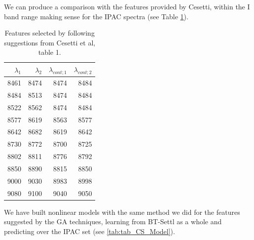 
We can produce a comparison with the features provided by Cesetti, within the I band range
making sense for the IPAC spectra (see Table \ref{tab:tab_CS_T}).
\begin{table}
\begin{center}
\begin{tabular}{rrrr}
  \hline
  $\lambda_1$ & $\lambda_2$ & $\lambda_{cont;1}$ & $\lambda_{cont;2} $ \\ 
  \hline
8461 & 8474 & 8474 & 8484 \\
8484 & 8513 & 8474 & 8484 \\
8522 &  8562 & 8474 & 8484 \\
8577 & 8619 & 8563 & 8577 \\
8642 & 8682 & 8619 & 8642 \\
8730 & 8772 & 8700 & 8725 \\
8802 & 8811 & 8776 & 8792 \\
8850 & 8890 & 8815 & 8850 \\
9000 & 9030 & 8983 & 8998 \\
9080  & 9100 & 9040 & 9050 \\

\hline
\end{tabular}
\caption {Features selected by following suggestions from Cesetti et al, table 1. } 
\label{tab:tab_CS_T}
\end{center}
\end{table}

We have built nonlinear models with the same method we did for the features suggested 
by the GA techniques, learning from BT-Settl as a whole and predicting over the IPAC set
(see \ref{tab:tab_CS_Model}).

